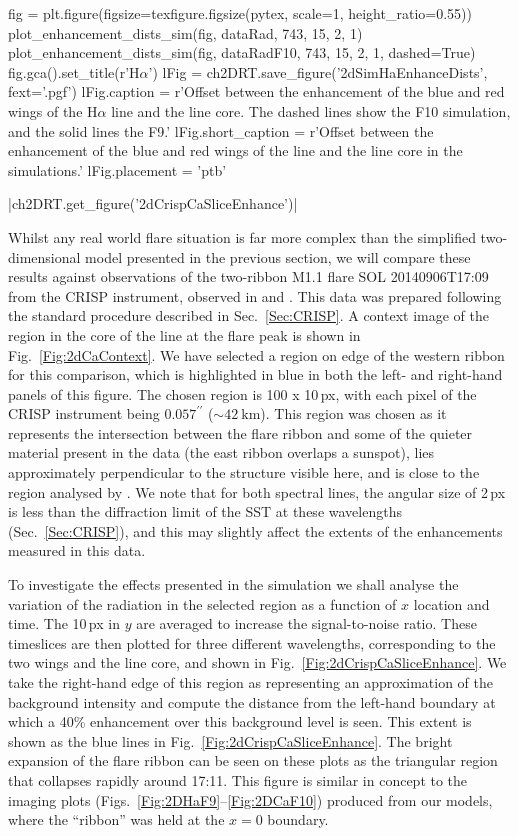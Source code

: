 \begin{pycode}[2DRT]
fig = plt.figure(figsize=texfigure.figsize(pytex, scale=1, height_ratio=0.55))
plot_enhancement_dists_sim(fig, dataRad, 743, 15, 2, 1)
plot_enhancement_dists_sim(fig, dataRadF10, 743, 15, 2, 1, dashed=True)
fig.gca().set_title(r'H$\alpha$')
lFig = ch2DRT.save_figure('2dSimHaEnhanceDists', fext='.pgf')
lFig.caption = r'Offset between the enhancement of the blue and red wings of the H$\alpha$ line and the line core. The dashed lines show the F10 simulation, and the solid lines the F9.'
lFig.short_caption = r'Offset between the enhancement of the blue and red wings of the \Ha{} line and the line core in the simulations.'
lFig.placement = 'ptb'
\end{pycode}

\py[2DRT]|ch2DRT.get_figure('2dCrispCaSliceEnhance')|

Whilst any real world flare situation is far more complex than the simplified two-dimensional model presented in the previous section, we will compare these results against observations of the two-ribbon M1.1 flare SOL 20140906T17:09 from the CRISP instrument, observed in \Ha{} and \CaLine{}.
This data was prepared following the standard procedure described in Sec.~\ref{Sec:CRISP}.
A context image of the region in the core of the \CaLine{} line at the flare peak is shown in Fig.~\ref{Fig:2dCaContext}.
We have selected a region on edge of the western ribbon for this comparison, which is highlighted in blue in both the left- and right-hand panels of this figure.
The chosen region is 100 x 10\,{}px, with each pixel of the CRISP instrument being $0.057^{\prime\prime}$ ($\sim\SI{42}{\kilo\metre}$).
This region was chosen as it represents the intersection between the flare ribbon and some of the quieter material present in the data (the east ribbon overlaps a sunspot), lies approximately perpendicular to the structure visible here, and is close to the region analysed by \citet{Kuridze2015}.
We note that for both spectral lines, the angular size of 2\,px is less than the diffraction limit of the SST at these wavelengths (Sec.~\ref{Sec:CRISP}), and this may slightly affect the extents of the enhancements measured in this data.

To investigate the effects presented in the simulation we shall analyse the variation of the radiation in the selected region as a function of $x$ location and time.
The 10\,{}px in $y$ are averaged to increase the signal-to-noise ratio.
These timeslices are then plotted for three different wavelengths, corresponding to the two wings and the line core, and shown in Fig.~\ref{Fig:2dCrispCaSliceEnhance}.
We take the right-hand edge of this region as representing an approximation of the background intensity and compute the distance from the left-hand boundary at which a 40\% enhancement over this background level is seen.
This extent is shown as the blue lines in Fig.~\ref{Fig:2dCrispCaSliceEnhance}.
The bright expansion of the flare ribbon can be seen on these plots as the triangular region that collapses rapidly around 17:11.
This figure is similar in concept to the imaging plots (Figs.~\ref{Fig:2DHaF9}--\ref{Fig:2DCaF10}) produced from our models, where the ``ribbon'' was held at the $x=0$ boundary.

